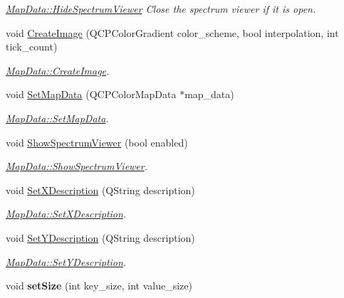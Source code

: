 \begin{DoxyCompactItemize}
\begin{DoxyCompactList}\small\item\em \hyperlink{class_map_data_a61f4104e14f8b8e0d1a51872412737e1}{Map\+Data\+::\+Hide\+Spectrum\+Viewer} Close the spectrum viewer if it is open. \end{DoxyCompactList}\item 
void \hyperlink{class_map_data_ad1fe1aaad46b33c4f6a2be1d7f889dee}{Create\+Image} (Q\+C\+P\+Color\+Gradient color\+\_\+scheme, bool interpolation, int tick\+\_\+count)
\begin{DoxyCompactList}\small\item\em \hyperlink{class_map_data_ad1fe1aaad46b33c4f6a2be1d7f889dee}{Map\+Data\+::\+Create\+Image}. \end{DoxyCompactList}\item 
void \hyperlink{class_map_data_a69f3cc1424820012dd81b21a171b1811}{Set\+Map\+Data} (Q\+C\+P\+Color\+Map\+Data $\ast$map\+\_\+data)
\begin{DoxyCompactList}\small\item\em \hyperlink{class_map_data_a69f3cc1424820012dd81b21a171b1811}{Map\+Data\+::\+Set\+Map\+Data}. \end{DoxyCompactList}\item 
void \hyperlink{class_map_data_af89b6dafdaa3a857c8c99256efabaa01}{Show\+Spectrum\+Viewer} (bool enabled)
\begin{DoxyCompactList}\small\item\em \hyperlink{class_map_data_af89b6dafdaa3a857c8c99256efabaa01}{Map\+Data\+::\+Show\+Spectrum\+Viewer}. \end{DoxyCompactList}\item 
void \hyperlink{class_map_data_a83f631070387a73af804b39cd8463c83}{Set\+X\+Description} (Q\+String description)
\begin{DoxyCompactList}\small\item\em \hyperlink{class_map_data_a83f631070387a73af804b39cd8463c83}{Map\+Data\+::\+Set\+X\+Description}. \end{DoxyCompactList}\item 
void \hyperlink{class_map_data_a7c08027239b5dada495ab7087b13a983}{Set\+Y\+Description} (Q\+String description)
\begin{DoxyCompactList}\small\item\em \hyperlink{class_map_data_a7c08027239b5dada495ab7087b13a983}{Map\+Data\+::\+Set\+Y\+Description}. \end{DoxyCompactList}\item 
\hypertarget{class_map_data_aae8067a6dcb4d2a43121903cf2937e6e}{void {\bfseries set\+Size} (int key\+\_\+size, int value\+\_\+size)}\label{class_map_data_aae8067a6dcb4d2a43121903cf2937e6e}


\end{DoxyCompactItemize}
